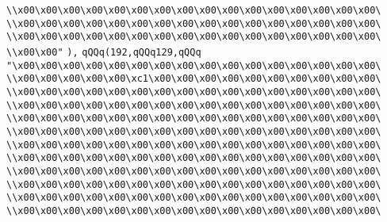 \verb|\\x00\x00\x00\x00\x00\x00\x00\x00\x00\x00\x00\x00\x00\x00\x00\x00\|\newline
\verb|\\x00\x00\x00\x00\x00\x00\x00\x00\x00\x00\x00\x00\x00\x00\x00\x00\|\newline
\verb|\\x00\x00\x00\x00\x00\x00\x00\x00\x00\x00\x00\x00\x00\x00\x00\x00\|\newline
\verb|\\x00\x00"|\newline
\verb|),|\newline
\verb|qQQq(192,qQQq129,qQQq|\newline
\verb|"\x00\x00\x00\x00\x00\x00\x00\x00\x00\x00\x00\x00\x00\x00\x00\x00\|\newline
\verb|\\x00\x00\x00\x00\x00\xc1\x00\x00\x00\x00\x00\x00\x00\x00\x00\x00\|\newline
\verb|\\x00\x00\x00\x00\x00\x00\x00\x00\x00\x00\x00\x00\x00\x00\x00\x00\|\newline
\verb|\\x00\x00\x00\x00\x00\x00\x00\x00\x00\x00\x00\x00\x00\x00\x00\x00\|\newline
\verb|\\x00\x00\x00\x00\x00\x00\x00\x00\x00\x00\x00\x00\x00\x00\x00\x00\|\newline
\verb|\\x00\x00\x00\x00\x00\x00\x00\x00\x00\x00\x00\x00\x00\x00\x00\x00\|\newline
\verb|\\x00\x00\x00\x00\x00\x00\x00\x00\x00\x00\x00\x00\x00\x00\x00\x00\|\newline
\verb|\\x00\x00\x00\x00\x00\x00\x00\x00\x00\x00\x00\x00\x00\x00\x00\x00\|\newline
\verb|\\x00\x00\x00\x00\x00\x00\x00\x00\x00\x00\x00\x00\x00\x00\x00\x00\|\newline
\verb|\\x00\x00\x00\x00\x00\x00\x00\x00\x00\x00\x00\x00\x00\x00\x00\x00\|\newline
\verb|\\x00\x00\x00\x00\x00\x00\x00\x00\x00\x00\x00\x00\x00\x00\x00\x00\|\newline
\verb|\\x00\x00\x00\x00\x00\x00\x00\x00\x00\x00\x00\x00\x00\x00\x00\x00\|\newline
